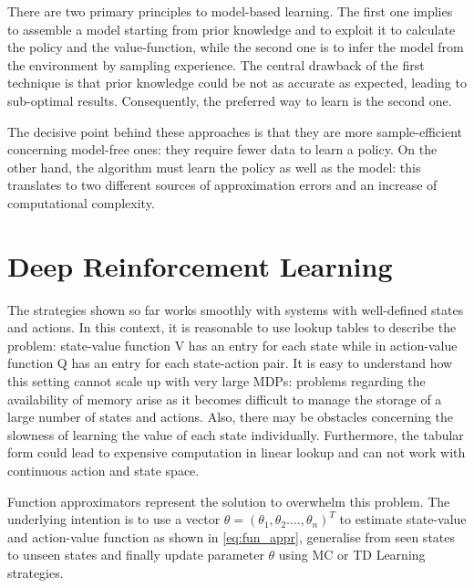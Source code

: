 There are two primary principles to model-based learning. The first one implies to assemble a model starting from prior knowledge and to exploit it to calculate the policy and the value-function, while the second one is to infer the model from the environment by sampling experience.
The central drawback of the first technique is that prior knowledge could be not as accurate as expected, leading to sub-optimal results. Consequently, the preferred way to learn is the second one.

The decisive point behind these approaches is that they are more sample-efficient concerning model-free ones: they require fewer data to learn a policy. On the other hand, the algorithm must learn the policy as well as the model: this translates to two different sources of approximation errors and an increase of computational complexity.

\section{Deep Reinforcement Learning} \label{deepreinflearn}



The strategies shown so far works smoothly with systems with well-defined states and actions. In this context, it is reasonable to use lookup tables to describe the problem: state-value function V has an entry for each state while in action-value function Q has an entry for each state-action pair.
It is easy to understand how this setting cannot scale up with very large MDPs: problems regarding the availability of memory arise as it becomes difficult to manage the storage of a large number of states and actions. Also, there may be obstacles concerning the slowness of learning the value of each state individually. Furthermore, the tabular form could lead to expensive computation in linear lookup and can not work with continuous action and state space.

Function approximators represent the solution to overwhelm this problem. The underlying intention is to use a vector $\theta = (\theta_1, \theta_2. \dots, \theta_n)^T$ to estimate state-value and action-value function as shown in \vref{eq:fun_appr}, generalise from seen states to unseen states and finally update parameter $\theta$ using MC or TD Learning strategies.

